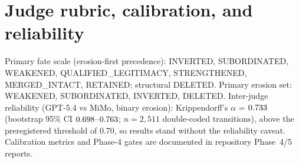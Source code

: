 \section{Judge rubric, calibration, and reliability}\label{app:rubric}
Primary fate scale (erosion-first precedence): INVERTED, SUBORDINATED, WEAKENED,
QUALIFIED\_LEGITIMACY, STRENGTHENED, MERGED\_INTACT, RETAINED; structural DELETED.
Primary erosion set: WEAKENED, SUBORDINATED, INVERTED, DELETED.
Inter-judge reliability (GPT-5.4 vs MiMo, binary erosion): Krippendorff's $\alpha$ = $0.733$ (bootstrap 95\% CI $0.698$--$0.763$; $n = 2{,}511$ double-coded transitions), above the preregistered threshold of 0.70, so results stand without the reliability caveat.
Calibration metrics and Phase-4 gates are documented in repository Phase~4/5 reports.
